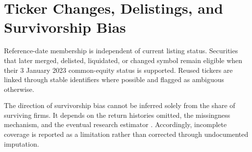 \section{Ticker Changes, Delistings, and Survivorship Bias}

Reference-date membership is independent of current listing status. Securities
that later merged, delisted, liquidated, or changed symbol remain eligible when
their 3 January 2023 common-equity status is supported. Reused tickers are
linked through stable identifiers where possible and flagged as ambiguous
otherwise.



The direction of survivorship bias cannot be inferred solely from the share of
surviving firms. It depends on the return histories omitted, the missingness
mechanism, and the eventual research estimator \citep{brown1992survivorship}.
Accordingly, incomplete coverage is reported as a limitation rather than
corrected through undocumented imputation.
